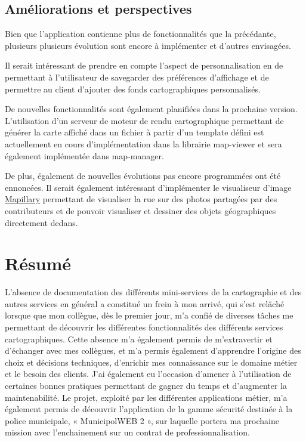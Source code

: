 \documentclass{rapportUHA40}
\begin{document}
\subsection{Améliorations et perspectives}
Bien que l'application contienne plus de fonctionnalités que la précédante,
plusieurs plusieurs évolution sont encore à implémenter et d'autres envisagées.

Il serait intéressant de prendre en compte l'aspect de personnalisation en de
permettant à l'utilisateur de savegarder des préférences d'affichage et de
permettre au client d'ajouter des fonds cartographiques personnalisés.

De nouvelles fonctionnalités sont également planifiées dans la prochaine
version. L'utilisation d'un serveur de moteur de rendu cartographique
permettant de générer la carte affiché dans un fichier à partir d'un template
défini est actuellement en cours d'implémentation dans la librairie map-viewer
et sera également implémentée dans map-manager.

De plus, également de nouvelles évolutions pas encore programmées ont été
ennoncées. Il serait également intéressant d'implémenter le visualiseur d'image
\href{https://www.mapillary.com/app/}{Mapillary} permettant de visualiser la
rue sur des photos partagées par des contributeurs et de pouvoir visualiser et
dessiner des objets géographiques directement dedans.


\newpage
\section*{Résumé}

L’absence de documentation des différents mini-services de la cartographie et
des autres services en général a constitué un frein à mon arrivé, qui s’est
relâché lorsque que mon collègue, dès le premier jour, m’a confié de diverses
tâches me permettant de découvrir les différentes fonctionnalités des
différents services cartographiques. Cette absence m’a également permis de
m’extravertir et d’échanger avec mes collègues, et m’a permis également
d’apprendre l’origine des choix et décisions techniques, d’enrichir mes
connaissance sur le domaine métier et le besoin des clients. J’ai également eu
l’occasion d’amener à l’utilisation de certaines bonnes pratiques permettant de
gagner du temps et d’augmenter la maintenabilité. Le projet, exploité par les
différentes applications métier, m’a également permis de découvrir
l’application de la gamme sécurité destinée à la police municipale, «
MunicipolWEB 2 », sur laquelle portera ma prochaine mission avec l’enchainement
sur un contrat de professionnalisation.
\end{document}
